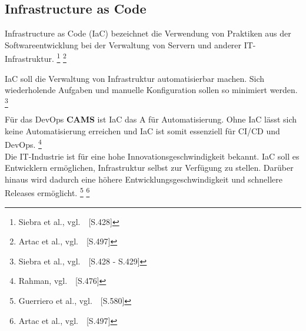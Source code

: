 \newpage
\subsection{Infrastructure as Code}\label{iac_basics}

Infrastructure as Code (IaC) bezeichnet die Verwendung von Praktiken aus der Softwareentwicklung bei der Verwaltung von Servern und anderer IT-Infrastruktur.
\footnote{Siebra et al., vgl.~\cite{Siebra2019}~[S.428]}
\footnote{Artac et al., vgl.~\cite{Artac2017}~[S.497]}

IaC soll die Verwaltung von Infrastruktur automatisierbar machen.
Sich wiederholende Aufgaben und manuelle Konfiguration sollen so minimiert werden.
\footnote{Siebra et al., vgl.~\cite{Siebra2019}~[S.428 - S.429]}

Für das DevOps \textbf{CAMS} ist IaC das A für Automatisierung.
Ohne IaC lässt sich keine Automatisierung erreichen und IaC ist somit essenziell für CI/CD und DevOps.
\footnote{Rahman, vgl.~\cite{Rahman2018c}~[S.476]} \\

Die IT-Industrie ist für eine hohe Innovationsgeschwindigkeit bekannt.
IaC soll es Entwicklern ermöglichen, Infrastruktur selbst zur Verfügung zu stellen.
Darüber hinaus wird dadurch eine höhere Entwicklungsgeschwindigkeit und schnellere Releases ermöglicht.
\footnote{Guerriero et al., vgl.~\cite{Guerriero2019}~[S.580]}
\footnote{Artac et al., vgl.~\cite{Artac2017}~[S.497]}
